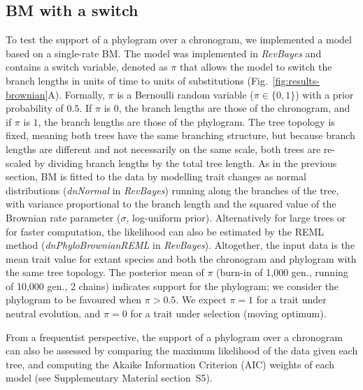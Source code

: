 \documentclass{article}
\newcommand{\PhyloSupport}{\pi}
\begin{document}
\subsection*{BM with a switch}
To test the support of a phylogram over a chronogram, we implemented a model based on a single-rate BM.
The model was implemented in \textit{RevBayes} and contains a switch variable, denoted as $\PhyloSupport$ that allows the model to switch the branch lengths in units of time to units of substitutions (Fig.~\ref{fig:results-brownian}A).
Formally, $\PhyloSupport$ is a Bernoulli random variable ($\PhyloSupport \in \{0, 1\}$) with a prior probability of $0.5$.
If $\PhyloSupport$ is $0$, the branch lengths are those of the chronogram, and if $\PhyloSupport$ is $1$, the branch lengths are those of the phylogram.
The tree topology is fixed, meaning both trees have the same branching structure, but because branch lengths are different and not necessarily on the same scale, both trees are re-scaled by dividing branch lengths by the total tree length.
As in the previous section, BM is fitted to the data by modelling trait changes as normal distributions (\textit{dnNormal} in \textit{RevBayes}) running along the branches of the tree, with variance proportional to the branch length and the squared value of the Brownian rate parameter ($\sigma$, log-uniform prior).
Alternatively for large trees or for faster computation, the likelihood can also be estimated by the REML method (\textit{dnPhyloBrownianREML} in \textit{RevBayes}).
Altogether, the input data is the mean trait value for extant species and both the chronogram and phylogram with the same tree topology.
The posterior mean of $\PhyloSupport$ (burn-in of 1,000 gen., running of 10,000 gen., 2 chains) indicates support for the phylogram; we consider the phylogram to be favoured when $\PhyloSupport > 0.5$.
We expect $\PhyloSupport = 1$ for a trait under neutral evolution, and $\PhyloSupport = 0$ for a trait under selection (moving optimum).

From a frequentist perspective, the support of a phylogram over a chronogram can also be assessed by comparing the maximum likelihood of the data given each tree, and computing the Akaike Information Criterion (AIC) weights of each model (see Supplementary Material section~S5).
\end{document}
